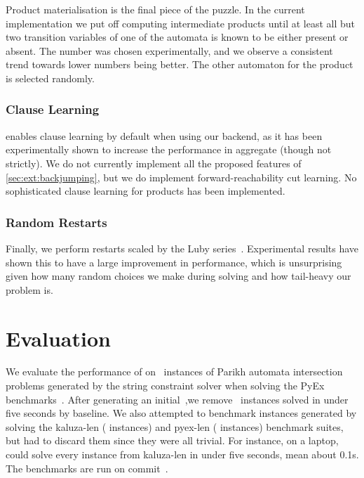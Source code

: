 \documentclass[acmsmall,review,anonymous,screen]{acmart}\settopmatter{printfolios=true,printccs=true,printacmref=true}
\theoremstyle{definition}
\begin{document}
Product materialisation is the final piece of the puzzle. In the current
implementation we put off computing intermediate products until at least all but
two transition variables of one of the automata is known to be either present or
absent. The number was chosen experimentally, and we observe a consistent trend
towards lower numbers being better. The other automaton for the product is
selected randomly.

\subsubsection{Clause Learning}

\Catra{} enables clause learning by default when using our backend, as it has
been experimentally shown to increase the performance in aggregate (though not
strictly). We do not currently implement all the proposed features of
\cref{sec:ext:backjumping}, but we do implement forward-reachability cut
learning. No sophisticated clause learning for products has been implemented.

\subsubsection{Random Restarts}

Finally, we perform restarts scaled by the Luby series~\cite{luby}. Experimental
results have shown this to have a large improvement in performance, which is
unsurprising given how many random choices we make during solving and how
tail-heavy our problem is.

\section{Evaluation}\label{sec:experiments}

We evaluate the performance of \Catra{} on~\NrBenchmarks{} instances of Parikh
automata intersection problems generated by the \OstrichPlus{} string constraint
solver when solving the PyEx benchmarks~\cite{pyex}. After generating an
initial~\InitialNrBenchmarks{},we remove~\NrTrivial{} instances solved in under
five seconds by baseline. We also attempted to benchmark instances generated by \Ostrich{} solving the kaluza-len ( instances) and pyex-len ( instances) benchmark suites, but had to discard them since they were all trivial. For instance, on a laptop, \Calculus{} could solve every instance from kaluza-len in under five seconds, mean about 0.1s. The benchmarks are run on commit~\texttt{\commit}.
\end{document}

